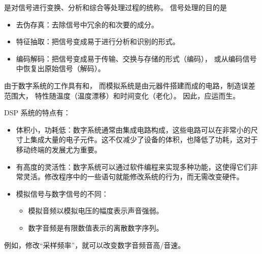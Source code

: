 \begin{definition}[信号处理]
    是对信号进行变换、分析和综合等处理过程的统称。
    信号处理的目的是
    \begin{itemize}
        \item 去伪存真：去除信号中冗余的和次要的成分。
        \item 特征抽取：把信号变成易于进行分析和识别的形式。
        \item 编码解码：把信号变成易于传输、交换与存储的形式（编码），
            或从编码信号中恢复出原始信号（解码）。
    \end{itemize}
\end{definition}

\begin{example}
    由于数字系统的工作具有和，
    而模拟系统是由元器件搭建而成的电路，制造误差范围大，
    特性随温度（温度漂移）和时间变化（老化）。
    因此，应运而生。

    DSP 系统的特点有：
    \begin{itemize}
        \item 体积小，功耗低：数字系统通常由集成电路构成，这些电路可以在非常小的尺寸上集成大量的电子元件。这不仅减少了设备的体积，也降低了功耗，这对于移动终端的发展尤为重要。
        \item 有高度的灵活性：数字系统可以通过软件编程来实现多种功能，这使得它们非常灵活。修改程序中的一些语句就能修改系统的行为，而无需改变硬件。
        \item 模拟信号与数字信号的不同：
            \begin{itemize}
                \item 模拟音频以模拟电压的幅度表示声音强弱。
                \item 数字音频是有限数值表示的离散数字序列。
            \end{itemize}
    \end{itemize}
    例如，修改``采样频率''，就可以改变数字音频音高/音速。
\end{example}
